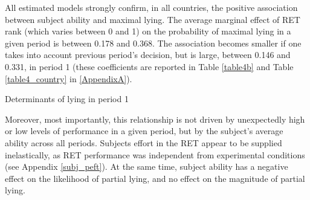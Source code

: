\documentclass[12pt]{article}
\begin{document}
\par All estimated models strongly confirm, in all countries, the positive association between subject ability and maximal lying. The average marginal effect of RET rank (which varies between 0 and 1) on the probability of maximal lying in a given period is between 0.178 and 0.368. The association becomes smaller if one takes into account previous period's decision, but is large, between 0.146 and 0.331, in period 1 (these coefficients are reported in Table \ref{table4b} and Table \ref{table4_country} in \ref{AppendixA}). 

\begin{table}[ht]
\begin{center}
\tiny

\end{center}
\caption{Determinants of lying in period 1}
\label{table4b}
\end{table}

\par Moreover, most importantly, this relationship is not driven by unexpectedly high or low levels of performance in a given period, but by the subject's average ability across all periods.\footnotemark{}
 Subjects effort in the RET appear to be supplied inelastically, as RET performance was independent from experimental conditions (see Appendix \ref{subj_peft}). At the same time, subject ability has a negative effect on the likelihood of partial lying, and no effect on the magnitude of partial lying.\footnotemark{}

\end{document}
